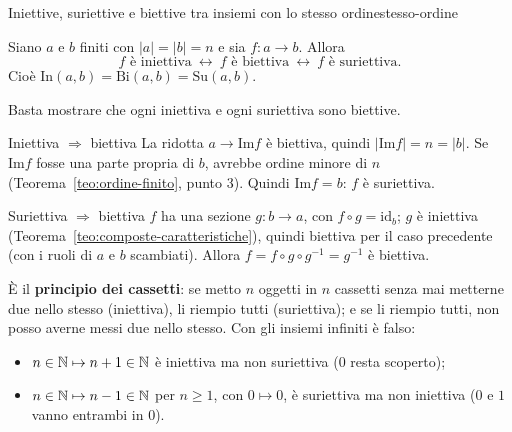 \begin{concetto}
\begin{Teorema}{Iniettive, suriettive e biettive tra insiemi con lo stesso ordine}{stesso-ordine}
    \begin{prerequisiti}
    \end{prerequisiti}
    Siano $a$ e $b$ finiti con $|a| = |b| = n$ e sia $f \colon a \to b$. Allora
    \[ f \text{ è iniettiva} \ \leftrightarrow\ f \text{ è biettiva} \ \leftrightarrow\ f \text{ è suriettiva}. \]
    Cioè $\mathrm{In}(a, b) = \mathrm{Bi}(a, b) = \mathrm{Su}(a, b)$.
\end{Teorema}
\begin{dimostrazione}
    Basta mostrare che ogni iniettiva e ogni suriettiva sono biettive.
    \begin{caso}{Iniettiva $\Rightarrow$ biettiva}
        La ridotta $a \to \mathrm{Im} f$ è biettiva, quindi $|\mathrm{Im} f| = n = |b|$. Se $\mathrm{Im} f$ fosse una parte propria di $b$, avrebbe ordine
        minore di $n$ (Teorema~\ref{teo:ordine-finito}, punto 3). Quindi $\mathrm{Im} f = b$: $f$ è suriettiva.
    \end{caso}
    \begin{caso}{Suriettiva $\Rightarrow$ biettiva}
        $f$ ha una sezione $g \colon b \to a$, con $f \circ g = \mathrm{id}_b$; $g$ è iniettiva (Teorema~\ref{teo:composte-caratteristiche}), quindi biettiva per il
        caso precedente (con i ruoli di $a$ e $b$ scambiati). Allora $f = f \circ g \circ g^{-1} = g^{-1}$ è biettiva.
    \end{caso}
\end{dimostrazione}
\end{concetto}

\begin{spiegazione}
    È il \textbf{principio dei cassetti}: se metto $n$ oggetti in $n$ cassetti senza mai metterne due nello stesso (iniettiva), li
    riempio tutti (suriettiva); e se li riempio tutti, non posso averne messi due nello stesso. Con gli insiemi infiniti è falso:
    \begin{itemize}
        \item $n \in \mathbb{N} \mapsto n + 1 \in \mathbb{N}$ è iniettiva ma non suriettiva ($0$ resta scoperto);
        \item $n \in \mathbb{N} \mapsto n - 1 \in \mathbb{N}$ per $n \geq 1$, con $0 \mapsto 0$, è suriettiva ma non iniettiva ($0$ e $1$ vanno entrambi in $0$).
    \end{itemize}
\end{spiegazione}

